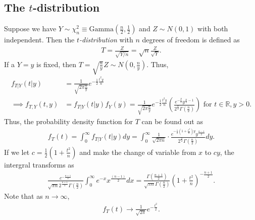 \documentclass[15pt,a4paper]{book}
\theoremstyle{definition}
\newcommand{\eax}[1]{\emph{#1}\index{#1}} %
\newcommand{\R}{\mathbb{R}}
\begin{document}
\subsection{The $t$-distribution}
Suppose we have $Y \sim \chi_{n}^{2} \equiv \text{Gamma}(\frac{n}{2},\frac{1}{2})$ and $Z \sim N(0,1)$ with both independent. Then the \eax{$t$-distribution} with $n$ degrees of freedom is defined as
\begin{align}
    T = \frac{Z}{\sqrt{Y/n}} = \sqrt{n} \frac{Z}{\sqrt{Y}}.
\end{align}
If a $Y = y$ is fixed, then $T = \sqrt{\frac{n}{y}}Z \sim N(0, \frac{n}{y})$. Thus,
\begin{align}
    f_{T|Y}(t|y) &= \frac{1}{\sqrt{2\pi \frac{n}{y}}} e^{-\frac{1}{2}\frac{t^{2}y}{n}} \\
    \implies f_{T,Y}(t,y) &= f_{T | Y}(t|y)f_{Y}(y) = \frac{1}{\sqrt{2\pi \frac{n}{y}}} e^{-\frac{1}{2}\frac{t^{2}y}{n}} \left( \frac{e^{-\frac{y}{2}}y^{\frac{n}{2}-1}}{2^{\frac{n}{2}}\Gamma(\frac{n}{2})} \right) \text{ for } t \in \R, y > 0.
\end{align}
Thus, the probability density function for $T$ can be found out as
\begin{align}
    f_{T}(t) = \int_{0}^{\infty} f_{T|Y}(t|y)dy = \int_{0}^{\infty} \frac{1}{\sqrt{2\pi n}} \cdot \frac{e^{-\frac{1}{2}(1+\frac{t^{2}}{n})y}y^{\frac{n-1}{2}}}{2^{\frac{n}{2}}\Gamma(\frac{n}{2})}dy.
\end{align}
If we let $c = \frac{1}{2}(1+\frac{t^{2}}{n})$ and make the change of variable from $x$ to $cy$, the intergral transforms as
\begin{align}
    \frac{c^{-\frac{n+1}{2}}}{\sqrt{\pi n} 2^{\frac{n+1}{2}} \Gamma(\frac{n}{2})} \int_{0}^{\infty} e^{-x} x^{\frac{(n-1)}{2}} dx = \frac{\Gamma(\frac{n+1}{2})}{\sqrt{\pi n} \Gamma(\frac{n}{2})} \left( 1+\frac{t^{2}}{n} \right)^{-\frac{n+1}{2}}.
\end{align}
Note that as $n \to \infty$,
\begin{align}
    f_{T}(t) \to \frac{1}{\sqrt{2\pi}} e^{-\frac{t^{2}}{2}}.
\end{align}
\end{document}
